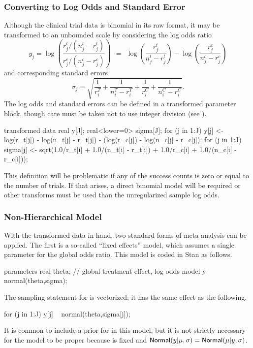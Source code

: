 \subsubsection{Converting to Log Odds and Standard Error}

Although the clinical trial data is binomial in its raw format, it may
be transformed to an unbounded scale by considering the log odds ratio
\[
y_j = \log \left( \frac{r^t_j / (n^t_j - r^t_j)}
                       {r^c_j / (n^c_j - r^c_j)} \right)
\ \ = \ \ 
\log \left( \frac{r^t_j}{n^t_j - r^t_j} \right)
- 
\log \left( \frac{r^c_j}{n^c_j - r^c_j} \right)
\]
and corresponding standard errors
\[
\sigma_j = \sqrt{
\frac{1}{r^T_i} 
+ \frac{1}{n^T_i - r^T_i}
+ \frac{1}{r^C_i} 
+ \frac{1}{n^C_i - r^C_i}
}.
\]
%
The log odds and standard errors can be defined in a
transformed parameter block, though care must be taken not to use
integer division (see \refsection{int-arithmetic}).
%
\begin{stancode}
transformed data {
  real y[J];
  real<lower=0> sigma[J];
  for (j in 1:J) 
    y[j] <- log(r_t[j]) - log(n_t[j] - r_t[j])
            - (log(r_c[j]) - log(n_c[j] - r_c[j]);
  for (j in 1:J)
    sigma[j] <- sqrt(1.0/r_t[i] + 1.0/(n_t[i] - r_t[i])
                     + 1.0/r_c[i] + 1.0/(n_c[i] - r_c[i]));
}
\end{stancode}
%
This definition will be problematic if any of the success counts is 
zero or equal to the number of trials.
If that arises, a direct binomial model will be required or other
transforms must be used than the unregularized sample log odds.

\subsubsection{Non-Hierarchical Model}

With the transformed data in hand, two standard forms of meta-analysis
can be applied.  The first is a so-called ``fixed effects'' model,
which assumes a single parameter for the global odds ratio.  This
model is coded in Stan as follows.
%
\begin{stancode}
parameters {
  real theta;  // global treatment effect, log odds
}
model {
  y ~ normal(theta,sigma);
}
\end{stancode}
%
The sampling statement for  is vectorized; it has the same
effect as the following.
\begin{stancode}
  for (j in 1:J)
    y[j] ~ normal(theta,sigma[j]);
\end{stancode}
%
It is common to include a prior for  in this model, but it
is not strictly necessary for the model to be proper because \code{y}
is fixed and $\distro{Normal}(y|\mu,\sigma) =
\distro{Normal}(\mu|y,\sigma)$.

